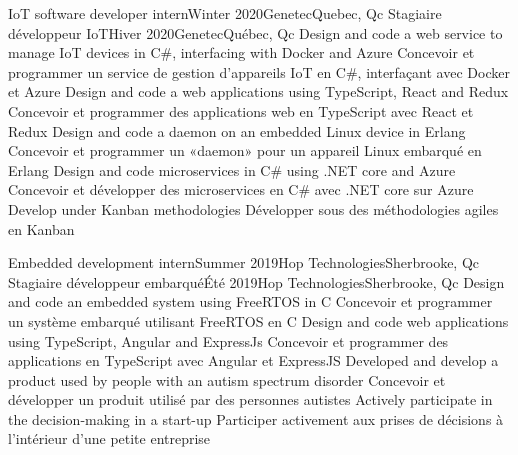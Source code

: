     \resumeSubheadingEnFr
        {IoT software developer intern}{Winter 2020}{Genetec}{Quebec, Qc}
        {Stagiaire développeur IoT}{Hiver 2020}{Genetec}{Québec, Qc}
            \resumeItemListStart
                \resumeItemEnFr
                    {Design and code a web service to manage IoT devices in C\#, interfacing with Docker and Azure}
                    {Concevoir et programmer un service de gestion d’appareils IoT en C\#, interfaçant avec Docker et Azure}
                \resumeItemEnFr
                    {Design and code a web applications using TypeScript, React and Redux}
                    {Concevoir et programmer des applications web en TypeScript avec React et Redux}
                \resumeItemEnFr
                    {Design and code a daemon on an embedded Linux device in Erlang}
                    {Concevoir et programmer un «daemon» pour un appareil Linux embarqué en Erlang}
                \resumeItemEnFr
                    {Design and code microservices in C\# using .NET core and Azure}
                    {Concevoir et développer des microservices en C\# avec .NET core sur Azure}
                \resumeItemEnFr
                    {Develop under Kanban methodologies}
                    {Développer sous des méthodologies agiles en Kanban}
            \resumeItemListEnd

    \resumeSubheadingEnFr
      {Embedded development intern}{Summer 2019}{Hop Technologies}{Sherbrooke, Qc}
      {Stagiaire développeur embarqué}{Été 2019}{Hop Technologies}{Sherbrooke, Qc}
            \resumeItemListStart
                \resumeItemEnFr
                    {Design and code an embedded system using FreeRTOS in C}
                    {Concevoir et programmer un système embarqué utilisant FreeRTOS en C}
                \resumeItemEnFr
                    {Design and code web applications using TypeScript, Angular and ExpressJs}
                    {Concevoir et programmer des applications en TypeScript avec Angular et ExpressJS}
                \resumeItemEnFr
                    {Developed and develop a product used by people with an autism spectrum disorder}
                    {Concevoir et développer un produit utilisé par des personnes autistes}
                \resumeItemEnFr
                    {Actively participate in the decision-making in a start-up}
                    {Participer activement aux prises de décisions à l’intérieur d’une petite entreprise}
            \resumeItemListEnd

